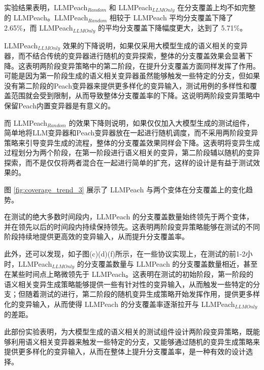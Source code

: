 \newpage

实验结果表明，LLMPeach$_{Random}$ 和 LLMPeach$_{LLMOnly}$ 在分支覆盖上均不如完整的 LLMPeach。LLMPeach$_{Random}$ 相较于 LLMPeach 平均分支覆盖下降了 2.65\%，而 LLMPeach$_{LLMOnly}$ 的平均分支覆盖下降幅度更大，达到了 5.71\%。

LLMPeach$_{LLMOnly}$ 效果的下降说明，如果仅采用大模型生成的语义相关的变异器，而不结合传统的变异器进行随机的变异探索，整体的分支覆盖效果会显著下降。这表明两阶段变异策略中的第二阶段，在提升分支覆盖方面同样发挥了作用。可能是因为第一阶段生成的语义相关变异器虽然能够触发一些特定的分支，但如果没有第二阶段的Peach变异器来提供更多样化的变异输入，测试用例的多样性和覆盖范围就会受到限制，从而导致整体分支覆盖率的下降。这说明两阶段变异策略中保留Peach内置变异器是有意义的。

而 LLMPeach$_{Random}$ 的效果下降则说明，如果仅仅加入大模型生成的测试组件，简单地将LLM变异器和Peach变异器放在一起进行随机调度，而不采用两阶段变异策略来引导变异生成的流程，整体的分支覆盖效果同样会下降。这表明将变异生成过程划分为两个阶段，在第一阶段进行语义相关的变异，第二阶段辅以随机的变异探索，而不是仅仅将两者混合在一起进行简单的扩充，这样的设计是有益于测试效果的。

图 \ref{fig:coverage_trend_3} 展示了 LLMPeach 与两个变体在分支覆盖上的变化趋势。

在测试的绝大多数时间段内，LLMPeach 的分支覆盖数量始终领先于两个变体，并在领先以后的时间段内持续保持领先。这表明两阶段变异策略能够在测试的不同阶段持续地提供更高效的变异输入，从而提升分支覆盖率。

此外，还可以发现，如子图(c)(d)(f)所示，在一些协议实现上，在测试的前1-2小时，LLMPeach$_{LLMOnly}$ 的分支覆盖数量与 LLMPeach 的分支覆盖数量相近，甚至在某些时间点上略微领先于 LLMPeach。这表明在测试的初始阶段，第一阶段的语义相关变异生成策略能够提供一些有针对性的变异输入，从而触发一些特定的分支；但随着测试的进行，第二阶段的随机变异生成策略开始发挥作用，提供更多样化的变异输入，从而使得 LLMPeach 的分支覆盖率逐渐拉开与 LLMPeach$_{LLMOnly}$ 的差距。

此部份实验表明，为大模型生成的语义相关的测试组件设计两阶段变异策略，既能够利用语义相关变异器来触发一些特定的分支，又能够通过随机的变异生成策略来提供更多样化的变异输入，从而在整体上提升分支覆盖率，是一种有效的设计选择。


